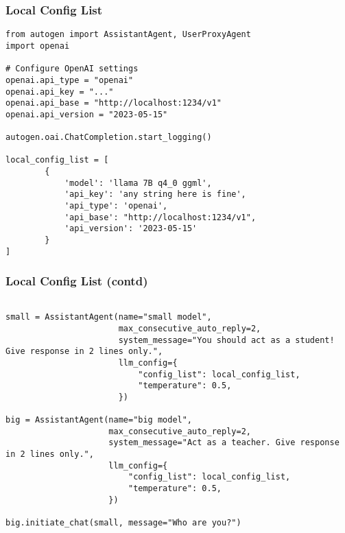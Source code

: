 \begin{frame}[fragile]\frametitle{Local Config List}

\begin{lstlisting}
from autogen import AssistantAgent, UserProxyAgent
import openai

# Configure OpenAI settings
openai.api_type = "openai"
openai.api_key = "..."
openai.api_base = "http://localhost:1234/v1"
openai.api_version = "2023-05-15"

autogen.oai.ChatCompletion.start_logging()

local_config_list = [
        {
            'model': 'llama 7B q4_0 ggml',
            'api_key': 'any string here is fine',
            'api_type': 'openai',
            'api_base': "http://localhost:1234/v1",
            'api_version': '2023-05-15'
        }
]
\end{lstlisting}
\end{frame}

\begin{frame}[fragile]\frametitle{Local Config List (contd)}

\begin{lstlisting}

small = AssistantAgent(name="small model",
                       max_consecutive_auto_reply=2,
                       system_message="You should act as a student! Give response in 2 lines only.",
                       llm_config={
                           "config_list": local_config_list,
                           "temperature": 0.5,
                       })

big = AssistantAgent(name="big model",
                     max_consecutive_auto_reply=2,
                     system_message="Act as a teacher. Give response in 2 lines only.",
                     llm_config={
                         "config_list": local_config_list,
                         "temperature": 0.5,
                     })

big.initiate_chat(small, message="Who are you?")
\end{lstlisting}
\end{frame}


